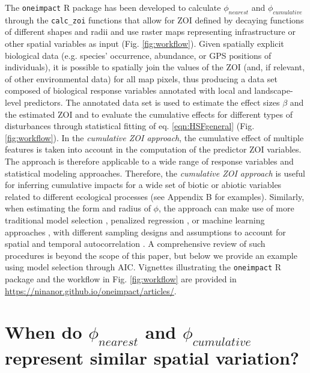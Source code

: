 \documentclass[titlepage]{article}
\begin{document}
The \verb|oneimpact| R package \citep{niebuhr_oneimpact_2023} has been developed to calculate  $\phi_{nearest}$ and $\phi_{cumulative}$ through the \verb|calc_zoi| functions that allow for ZOI defined by decaying functions of different shapes and radii and use raster maps representing infrastructure or other spatial variables as input (Fig. \ref{fig:workflow}). Given spatially explicit biological data (e.g. species’ occurrence, abundance, or GPS positions of individuals), it is possible to spatially join the values of the ZOI (and, if relevant, of other environmental data) for all map pixels, thus producing a data set composed of biological response variables annotated with local and landscape-level predictors. The annotated data set is used to estimate the effect sizes $\beta$ and the estimated ZOI and to evaluate the cumulative effects for different types of disturbances through statistical fitting of eq. \ref{eqn:HSFgeneral} (Fig. \ref{fig:workflow}). In the \textit{cumulative ZOI approach}, the cumulative effect of multiple features is taken into account in the computation of the predictor ZOI variables. The approach is therefore applicable to a wide range of response variables and statistical modeling approaches. Therefore, the \textit{cumulative ZOI approach} is useful for inferring cumulative impacts for a wide set of biotic or abiotic variables \citep[similar to][]{lowe_scalescape_2022} related to different ecological processes (see Appendix B for examples).
Similarly, when estimating the form and radius of $\phi$, the approach can make use of more traditional model selection \citep{burnham_model_2002,huais_multifit_2018}, penalized regression \citep{lee_estimating_2020}, or machine learning approaches \citep{pichler_machine_2022}, with different sampling designs and assumptions to account for spatial and temporal autocorrelation \citep[see][]{northrup_conceptual_2022}. A comprehensive review of such procedures is beyond the scope of this paper, but below we provide an example using model selection through AIC. Vignettes illustrating the \verb|oneimpact| R package and the workflow in Fig. \ref{fig:workflow} are provided in \url{https://ninanor.github.io/oneimpact/articles/}.

\section{When do $\phi_{nearest}$ and $\phi_{cumulative}$ represent similar spatial variation?}
\end{document}
